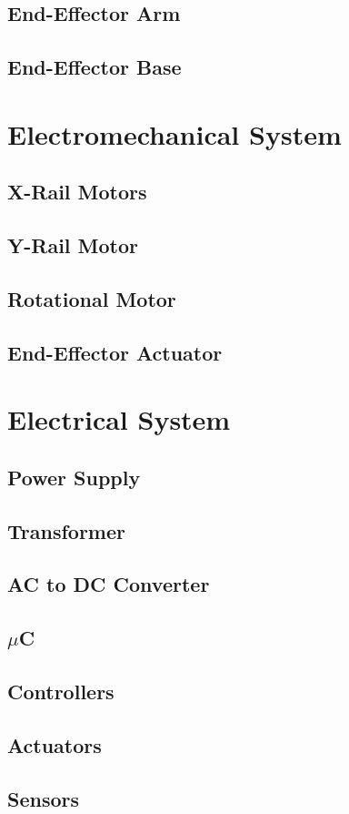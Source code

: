 \documentclass[titlepage]{article}
\begin{document}
\subsection{End-Effector Arm}
\subsection{End-Effector Base}



\section{Electromechanical System}
\subsection{X-Rail Motors}
\subsection{Y-Rail Motor}
\subsection{Rotational Motor}
\subsection{End-Effector Actuator}



\section{Electrical System}
\subsection{Power Supply}
\subsection{Transformer}
\subsection{AC to DC Converter}
\subsection{$\mu$C}
\subsection{Controllers}
\subsection{Actuators}
\subsection{Sensors}
\end{document}
